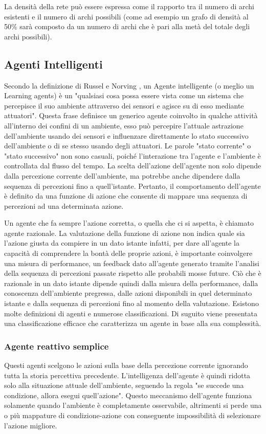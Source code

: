 La densità della rete può essere espressa come il rapporto tra il numero di archi esistenti e il numero di archi possibili (come ad esempio un grafo di densità al 50\% sarà composto da un numero di archi che è pari alla metà del totale degli archi possibili). \cite{NetworkScience}

\subsection{Agenti Intelligenti}

Secondo la definizione di Russel e Norving \cite{RusselNorvig}, un Agente intelligente (o meglio un Learning agents) è un "qualsiasi cosa possa essere vista come un sistema che percepisce il suo ambiente attraverso dei sensori e agisce su di esso mediante attuatori".
Questa frase definisce un generico agente coinvolto in qualche attività all'interno dei confini di un ambiente, esso può percepire l'attuale astrazione dell'ambiente usando dei sensori e influenzare direttamente lo stato successivo dell'ambiente o di se stesso usando degli attuatori. Le parole "stato corrente" o "stato successivo" non sono casuali, poiché l'interazione tra l’agente e l'ambiente è controllata dal flusso del tempo. La scelta dell'azione dell'agente non solo dipende dalla percezione corrente dell'ambiente, ma potrebbe anche dipendere dalla sequenza di percezioni fino a quell'istante. Pertanto, il comportamento dell'agente è definito da una funzione di azione che consente di mappare una sequenza di percezioni ad una determinata azione.

Un agente che fa sempre l'azione corretta, o quella che ci si aspetta, è chiamato agente razionale.
La valutazione della funzione di azione non indica quale sia l'azione giusta da compiere in un dato istante infatti, per dare all'agente la capacità di comprendere la bontà delle proprie azioni, è importante coinvolgere una misura di performance, un feedback dato all'agente generato tramite l'analisi della sequenza di percezioni passate rispetto alle probabili mosse future.
Ciò che è razionale in un dato istante dipende quindi dalla misura della performance, dalla conoscenza dell'ambiente pregressa, dalle azioni disponibili in quel determinato istante e dalla sequenza di percezioni fino al momento della valutazione.
Esistono molte definizioni di agenti e numerose classificazioni. Di suguito viene presentata una classificazione efficace che caratterizza un agente in base alla sua complessità.

\subsubsection{Agente reattivo semplice}
Questi agenti scelgono le azioni sulla base della percezione corrente ignorando tutta la storia percettiva precedente.
L'intelligenza dell'agente è quindi ridotta solo alla situazione attuale dell'ambiente, seguendo la regola "se succede una condizione, allora esegui quell'azione". Questo meccanismo dell'agente funziona solamente quando l'ambiente è completamente osservabile, altrimenti si perde una o più mappature di condizione-azione con conseguente impossibilità di selezionare l'azione migliore.

